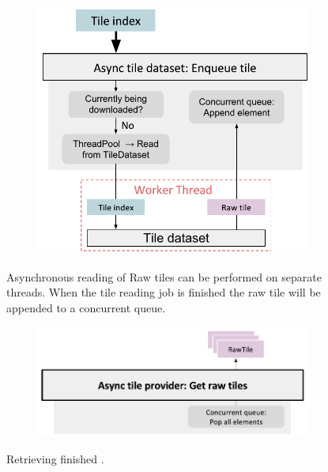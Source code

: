 \begin{figure}[htbp]
    \centering
    \begin{subfigure}[bt]{0.6\textwidth}
        \includegraphics[width=\textwidth]{figures/implementation/pipeline/asynctiledataset.pdf}
    \end{subfigure}
    \caption{Asynchronous reading of Raw tiles can be performed on separate threads. When the tile reading job is finished the raw tile will be appended to a concurrent queue.}
    \label{fig:asynctiledataset}
\end{figure}

\begin{figure}[htbp]
    \centering
    \begin{subfigure}[bt]{0.6\textwidth}
        \includegraphics[width=\textwidth]{figures/implementation/pipeline/asynctiledataset_gettiles.pdf}
    \end{subfigure}
    \caption{Retrieving finished .}
    \label{fig:asynctiledataset2}
\end{figure}

